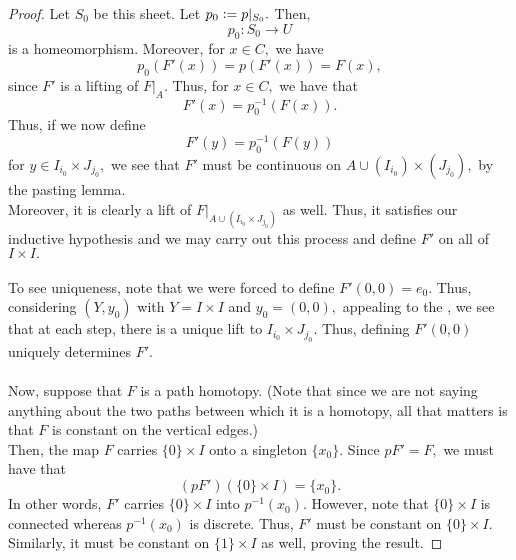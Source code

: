 \documentclass[12pt]{article}
\theoremstyle{definition}
\numberwithin{thm}{section}
\begin{document}
\begin{proof}
	Let $S_0$ be this sheet. Let $p_0 \vcentcolon= p|_{S_0}.$ Then,
	\begin{equation*} 
		p_0 : S_0 \to U
	\end{equation*}
	is a homeomorphism. Moreover, for $x \in C,$ we have
	\begin{equation*} 
		p_0(F'(x)) = p(F'(x)) = F(x),
	\end{equation*}
	since $F'$ is a lifting of $F|_A.$ Thus, for $x \in C,$ we have that
	\begin{equation*} 
		F'(x) = p_0^{-1}(F(x)).
	\end{equation*}
	Thus, if we now define
	\begin{equation*} 
		F'(y) = p_0^{-1}(F(y))
	\end{equation*}
	for $y \in I_{i_0} \times J_{j_0},$ we see that $F'$ must be continuous on $A \cup (I_{i_0}) \times (J_{j_0}),$ by the pasting lemma.\\
	Moreover, it is clearly a lift of $F|_{A \cup (I_{i_0} \times J_{j_0})}$ as well. Thus, it satisfies our inductive hypothesis and we may carry out this process and define $F'$ on all of $I \times I.$\\~\\
	To see uniqueness, note that we were forced to define $F'(0, 0) = e_0.$ Thus, considering $(Y, y_0)$ with $Y = I \times I$ and $y_0 = (0, 0),$ appealing to the , we see that at each step, there is a unique lift to $I_{i_0} \times J_{j_0}.$ Thus, defining $F'(0, 0)$ uniquely determines $F'.$\\~\\
	Now, suppose that $F$ is a path homotopy. (Note that since we are not saying anything about the two paths between which it is a homotopy, all that matters is that $F$ is constant on the vertical edges.)\\
	Then, the map $F$ carries $\{0\} \times I$ onto a singleton $\{x_0\}.$ Since $pF' = F,$ we must have that
	\begin{equation*} 
		(pF')(\{0\} \times I) = \{x_0\}.
	\end{equation*}
	In other words, $F'$ carries $\{0\} \times I$ into $p^{-1}(x_0).$ However, note that $\{0\} \times I$ is connected whereas $p^{-1}(x_0)$ is discrete. Thus, $F'$ must be constant on $\{0\} \times I.$\\
	Similarly, it must be constant on $\{1\} \times I$ as well, proving the result.
\end{proof}
\end{document}
